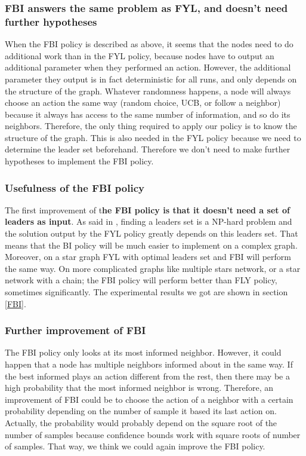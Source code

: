 \documentclass{article}
\begin{document}
\subsubsection{FBI answers the same problem as FYL, and doesn't need further hypotheses}

When the FBI policy is described as above, it seems that the nodes need to do additional work than in the FYL policy, because nodes have to output an additional parameter when they performed an action. However, the additional parameter they output is in fact deterministic for all runs, and only depends on the structure of the graph. Whatever randomness happens, a node will always choose an action the same way (random choice, UCB, or follow a neighbor) because it always has access to the same number of information, and so do its neighbors. Therefore, the only thing required to apply our policy is to know the structure of the graph. This is also needed in the FYL policy because we need to determine the leader set beforehand. Therefore we don't need to make further hypotheses to implement the FBI policy.

\subsubsection{Usefulness of the FBI policy}

The first improvement of t\textbf{he FBI policy is that it doesn't need a set of leaders as input}. As said in \cite{DBLP:journals/corr/KollaJG16}, finding a leaders set is a NP-hard problem and the solution output by the FYL policy greatly depends on this leaders set. That means that the BI policy will be much easier to implement on a complex graph. \\

Moreover, on a star graph FYL with optimal leaders set and FBI will perform the same way. On more complicated graphs like multiple stars network, or a star network with a chain; the FBI policy will perform better than FLY policy, sometimes significantly. The experimental results we got are shown in section \ref{FBI}.

\subsubsection{Further improvement of FBI}

The FBI policy only looks at its most informed neighbor. However, it could happen that a node has multiple neighbors informed about in the same way. If the best informed plays an action different from the rest, then there may be a high probability that the most informed neighbor is wrong. Therefore, an improvement of FBI could be to choose the action of a neighbor with a certain probability depending on the number of sample it based its last action on. Actually, the probability would probably depend on the square root of the number of samples because confidence bounds work with square roots of number of samples. That way, we think we could again improve the FBI policy.
\end{document}
